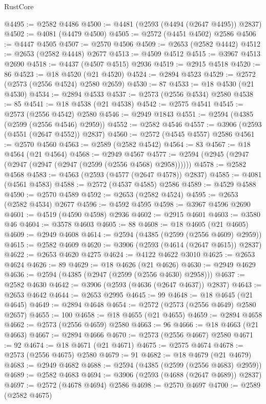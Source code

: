 \begin{lexlean}{RustCore}
\begin{coremodule}
@4495 := @2582 @4486
@4500 := @4481 (@2593 (@4494 (@2647 @4495)) @2837)
@4502 := @4081 (@4479 @4500)
@4505 := @2572 (@4451 @4502) @2586
@4506 := @4447 @4505
@4507 := @2570 @4506
@4509 := @2653 (@2582 @4442)
@4512 := @2653 (@2582 @4448) @2677
@4513 := @4509 @4512
@4515 := @3967 @4513 @2690
@4518 := @4437 (@4507 @4515) @2936
@4519 := @2915 @4518
@4520 := 86
@4523 := @18 @4520 (@21 @4520)
@4524 := @2894 @4523
@4529 := @2572 (@2573 (@2556 @4524) @2580 @2659)
@4530 := 87
@4533 := @18 @4530 (@21 @4530)
@4534 := @2894 @4533
@4537 := @2573 (@2556 @4534) @2580
@4538 := 85
@4541 := @18 @4538 (@21 @4538)
@4542 := @2575 @4541
@4545 := @2573 (@2556 @4542) @2580
@4546 := @2949 @1843
@4551 := @2594 (@4385 (@2599 (@2556 @4546) @2959))
@4552 := @2582 @4546
@4557 := @3906 (@2593 (@4551 (@2647 @4552)) @2837)
@4560 := @2572 (@4545 @4557) @2586
@4561 := @2570 @4560
@4563 := @2589 (@2582 @4542)
@4564 := 83
@4567 := @18 @4564 (@21 @4564)
@4568 := @2949 @4567
@4577 := @2594 (@2945 (@2947 (@2947 (@2947 (@2947 (@2599 (@2556 @4568) @2958))))))
@4578 := @2582 @4568
@4583 := @4563 (@2593 (@4577 (@2647 @4578)) @2837)
@4585 := @4081 (@4561 @4583)
@4588 := @2572 (@4537 @4585) @2586
@4589 := @4529 @4588
@4590 := @2570 @4589
@4592 := @2653 (@2582 @4524)
@4595 := @2653 (@2582 @4534) @2677
@4596 := @4592 @4595
@4598 := @3967 @4596 @2690
@4601 := @4519 (@4590 @4598) @2936
@4602 := @2915 @4601
@4603 := @3580 @46
@4604 := @3578 @4603
@4605 := 88
@4608 := @18 @4605 (@21 @4605)
@4609 := @2949 @4608
@4614 := @2594 (@4385 (@2599 (@2556 @4609) @2959))
@4615 := @2582 @4609
@4620 := @3906 (@2593 (@4614 (@2647 @4615)) @2837)
@4622 := @2653 @4620 @4275
@4624 := @4122 @4622 @3010
@4625 := @2653 @4624
@4626 := 89
@4629 := @18 @4626 (@21 @4626)
@4630 := @2949 @4629
@4636 := @2594 (@4385 (@2947 (@2599 (@2556 @4630) @2958)))
@4637 := @2582 @4630
@4642 := @3906 (@2593 (@4636 (@2647 @4637)) @2837)
@4643 := @2653 @4642
@4644 := @2653 @2995
@4645 := 99
@4648 := @18 @4645 (@21 @4645)
@4649 := @2894 @4648
@4654 := @2572 (@2573 (@2556 @4649) @2580 @2657)
@4655 := 100
@4658 := @18 @4655 (@21 @4655)
@4659 := @2894 @4658
@4662 := @2573 (@2556 @4659) @2580
@4663 := 96
@4666 := @18 @4663 (@21 @4663)
@4667 := @2894 @4666
@4670 := @2573 (@2556 @4667) @2580
@4671 := 92
@4674 := @18 @4671 (@21 @4671)
@4675 := @2575 @4674
@4678 := @2573 (@2556 @4675) @2580
@4679 := 91
@4682 := @18 @4679 (@21 @4679)
@4683 := @2949 @4682
@4688 := @2594 (@4385 (@2599 (@2556 @4683) @2959))
@4689 := @2582 @4683
@4694 := @3906 (@2593 (@4688 (@2647 @4689)) @2837)
@4697 := @2572 (@4678 @4694) @2586
@4698 := @2570 @4697
@4700 := @2589 (@2582 @4675)

\end{coremodule}
\end{lexlean}
